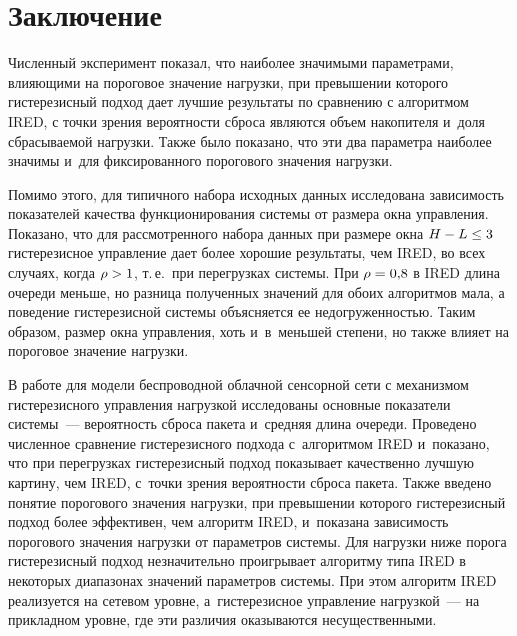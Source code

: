 \begin{multicols}{2}
\begin{figure*}
\begin{center}
\end{center}
\vspace*{-6pt}
\end{figure*}


\section{Заключение}

  Численный эксперимент показал, что наиболее значимыми параметрами, влияющими 
на пороговое значение нагрузки, при превышении которого гистерезисный подход дает 
лучшие результаты по сравнению с алгоритмом IRED, с точки зрения вероятности сброса 
являются объем накопителя и~доля сбрасываемой нагрузки. Также было показано, что эти 
два па\-ра\-мет\-ра наиболее значимы и~для фиксированного порогового значения нагрузки.
  
  Помимо этого, для типичного набора исходных данных исследована зависимость 
показателей качества функционирования системы от размера окна управления. Показано, 
что для рассмотренного набора данных при размере окна $H\hm- L\hm \leq 3$ 
гистерезисное управление дает более хорошие результаты, чем IRED, во всех случаях, 
когда $\rho\hm> 1$, т.\,е.\ при перегрузках системы. При $\rho\hm= 0{,}8$ в IRED длина 
очереди меньше, но разница полученных значений для обоих алгоритмов мала, а 
поведение гистерезисной сис\-те\-мы объясняется ее недогруженностью. Таким образом, 
размер окна управ\-ле\-ния, хоть и~в~меньшей степени, но также влияет на пороговое 
значение нагрузки.
  
  В работе для модели беспроводной облачной сенсорной сети с механизмом 
гистерезисного управ\-ле\-ния нагрузкой исследованы основные показатели сис\-те\-мы~--- 
вероятность сброса пакета и~средняя длина очереди. Проведено численное сравнение 
гистерезисного подхода с~алгоритмом IRED и~показано, что при перегрузках 
гистерезисный подход показывает качественно лучшую картину, чем IRED, с~точки 
зрения вероятности сброса пакета. Также введено понятие порогового значения нагрузки, 
при превышении которого гистерезисный подход более эффективен, чем алгоритм IRED, 
и~показана за\-ви\-си\-мость порогового значения нагрузки от па\-ра\-мет\-ров сис\-те\-мы. Для 
нагрузки ниже порога гистерезисный подход незначительно проигрывает алгоритму типа 
IRED в некоторых диапазонах значений параметров системы. При этом алгоритм IRED 
реализуется на сетевом уровне, а~гистерезисное управ\-ле\-ние нагрузкой~--- на при\-клад\-ном 
уровне, где эти различия оказываются несущественными.


\end{multicols}
